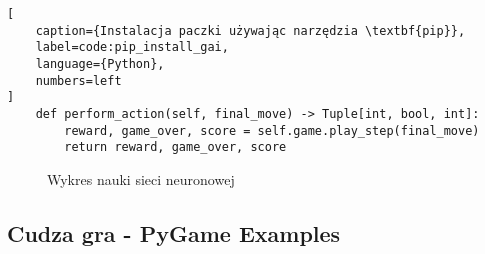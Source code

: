 \begin{onepage}
    \begin{lstlisting}[
    caption={Instalacja paczki używając narzędzia \textbf{pip}},
    label=code:pip_install_gai,
    language={Python},
    numbers=left
]
    def perform_action(self, final_move) -> Tuple[int, bool, int]:
        reward, game_over, score = self.game.play_step(final_move)
        return reward, game_over, score
    \end{lstlisting} \end{onepage}

\begin{figure}[h]
    \centering
    \caption{Wykres nauki sieci neuronowej}
    \label{img:ai_graph}
\end{figure}

\subsection{Cudza gra - PyGame Examples}
